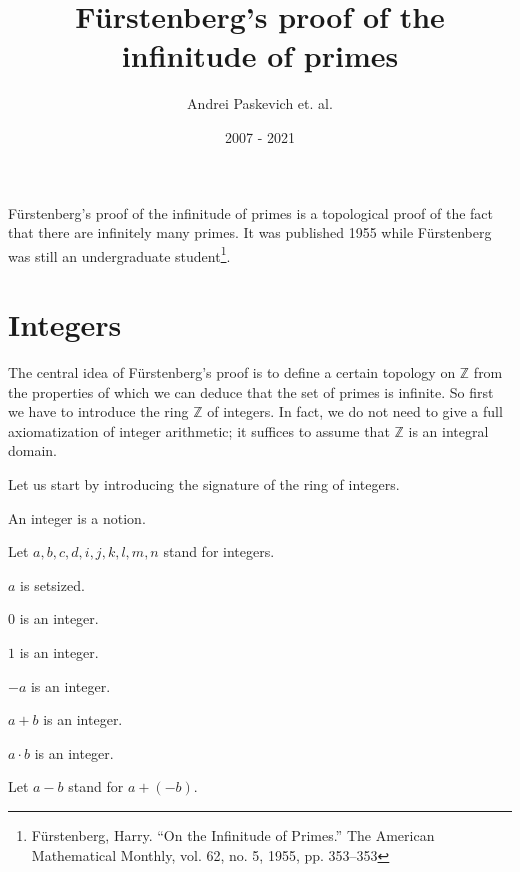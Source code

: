 \documentclass{article}
\title{Fürstenberg's proof of the infinitude of primes}
\author{Andrei Paskevich et. al.}
\date{2007 - 2021}
\newcommand{\Int}{\mathbb{Z}}
\begin{document}
  \maketitle

  Fürstenberg's proof of the infinitude of primes is a topological proof of the fact that there are infinitely many primes. It was published 1955 while Fürstenberg was still an undergraduate student\footnote{Fürstenberg, Harry. “On the Infinitude of Primes.” The American Mathematical Monthly, vol. 62, no. 5, 1955, pp. 353–353}.

  \section{Integers}

  The central idea of Fürstenberg's proof is to define a certain topology on $\Int$ from the properties of which we can deduce that the set of primes is infinite. So first we have to introduce the ring $\Int$ of integers. In fact, we do not need to give a full axiomatization of integer arithmetic; it suffices to assume that $\Int$ is an integral domain.

  Let us start by introducing the signature of the ring of integers.

  \begin{forthel}

    \begin{signature}[Integers]
      An integer is a notion.
    \end{signature}

    Let $a,b,c,d,i,j,k,l,m,n$ stand for integers.

    \begin{axiom}
      $a$ is setsized.
    \end{axiom}

    \begin{signature}[IntZero]
      $0$ is an integer.
    \end{signature}

    \begin{signature}[IntOne]
      $1$ is an integer.
    \end{signature}

    \begin{signature}[IntNeg]
      $-a$ is an integer.
    \end{signature}

    \begin{signature}[IntPlus]
      $a + b$ is an integer.
    \end{signature}

    \begin{signature}[IntMult]
      $a \cdot b$ is an integer.
    \end{signature}

    Let $a - b$ stand for $a + (-b)$.
  \end{forthel}
\end{document}
